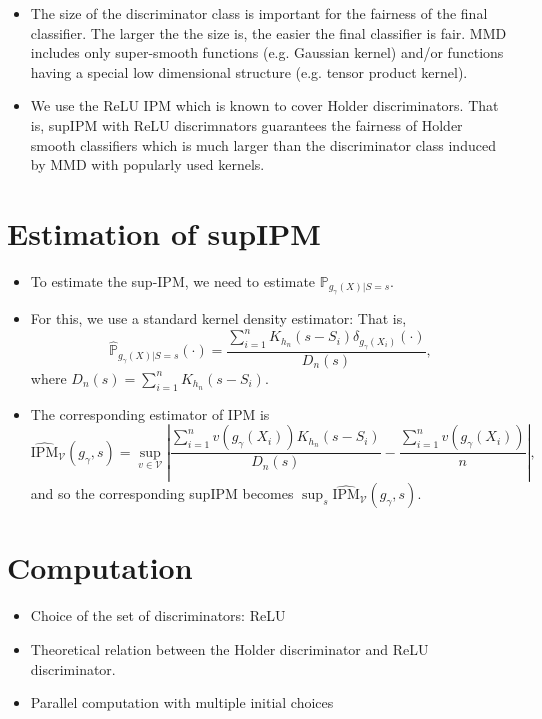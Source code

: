 \documentclass{article}
\begin{document}
\begin{itemize}
    on a given $S=s.$
    \item The size of the discriminator class is important for the fairness of the final classifier.
        The larger the the size is, the easier the final classifier is fair. MMD includes
        only super-smooth functions (e.g. Gaussian kernel) and/or functions having a special low dimensional structure (e.g. tensor product kernel). 
     \item We use the ReLU IPM which is known to cover Holder discriminators. That is, supIPM with ReLU discrimnators
     guarantees the fairness of Holder smooth classifiers which is much larger than the discriminator class
     induced by MMD with popularly used kernels. 
 \end{itemize}

\section{Estimation of supIPM}

\begin{itemize}
  \item To estimate the sup-IPM, we need to estimate $\mathbb{P}_{g_\gamma(X)|S=s}.$
  \item For this, we use a standard kernel density estimator: That is,
  $$\hat{\mathbb{P}}_{g_\gamma(X)|S=s} (\cdot)= \frac{\sum_{i=1}^n K_{h_n}(s-S_i) \delta_{g_\gamma(X_i)}(\cdot)}
    {D_n(s)},$$
  where $D_n(s)=\sum_{i=1}^n K_{h_n}(s-S_i).$  
  \item The corresponding estimator of IPM is
  $$\hat{\text{IPM}}_{\mathcal{V}}(g_\gamma,s)
    = \sup_{v\in \mathcal{V}} \left| \frac{\sum_{i=1}^n v(g_\gamma(X_i)) K_{h_n}(s-S_i)}{D_n(s)}
       -\frac{\sum_{i=1}^n v(g_\gamma(X_i))}{n}\right|,
  $$
  and so the corresponding supIPM becomes $\sup_s \hat{\text{IPM}}_{\mathcal{V}}(g_\gamma,s).$
\end{itemize}

\section{Computation}

\begin{itemize}
    \item Choice of the set of discriminators: ReLU
    \item Theoretical relation between the Holder discriminator and ReLU discriminator.
    \item Parallel computation with multiple initial choices
\end{itemize}
\end{document}
